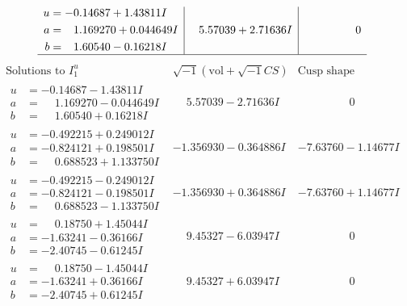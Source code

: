 \documentclass[1p]{elsarticle_modified}
\theoremstyle{definition}
\newcommand{\I}{\sqrt{-1}}
\begin{document}
$$\begin{array}{c|c|c}
\begin{aligned}
u &= -0.14687 + 1.43811 I \\
a &= \phantom{-}1.169270 + 0.044649 I \\
b &= \phantom{-}1.60540 - 0.16218 I\end{aligned}
 & \phantom{-}5.57039 + 2.71636 I & \phantom{-0.000000 } 0\\
 \hline 
 \end{array}$$\newpage$$\begin{array}{c|c|c}  
\text{Solutions to }I^u_{1}& \I (\text{vol} + \sqrt{-1}CS) & \text{Cusp shape}\\
 \hline 
\begin{aligned}
u &= -0.14687 - 1.43811 I \\
a &= \phantom{-}1.169270 - 0.044649 I \\
b &= \phantom{-}1.60540 + 0.16218 I\end{aligned}
 & \phantom{-}5.57039 - 2.71636 I & \phantom{-0.000000 } 0 \\ \hline\begin{aligned}
u &= -0.492215 + 0.249012 I \\
a &= -0.824121 + 0.198501 I \\
b &= \phantom{-}0.688523 + 1.133750 I\end{aligned}
 & -1.356930 - 0.364886 I & -7.63760 - 1.14677 I \\ \hline\begin{aligned}
u &= -0.492215 - 0.249012 I \\
a &= -0.824121 - 0.198501 I \\
b &= \phantom{-}0.688523 - 1.133750 I\end{aligned}
 & -1.356930 + 0.364886 I & -7.63760 + 1.14677 I \\ \hline\begin{aligned}
u &= \phantom{-}0.18750 + 1.45044 I \\
a &= -1.63241 - 0.36166 I \\
b &= -2.40745 - 0.61245 I\end{aligned}
 & \phantom{-}9.45327 - 6.03947 I & \phantom{-0.000000 } 0 \\ \hline\begin{aligned}
u &= \phantom{-}0.18750 - 1.45044 I \\
a &= -1.63241 + 0.36166 I \\
b &= -2.40745 + 0.61245 I\end{aligned}
 & \phantom{-}9.45327 + 6.03947 I & \phantom{-0.000000 } 0 \\ \hline\begin{aligned}

\end{aligned}
\end{array}$$
\end{document}
